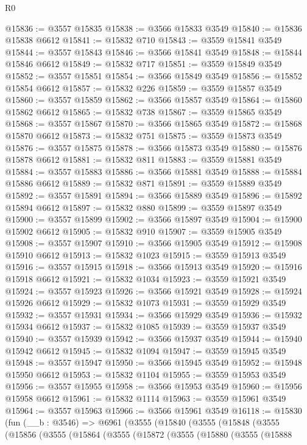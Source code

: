 \begin{lexlean}{R0}
\begin{coremodule}
@15836 := @3557 @15835
@15838 := @3566 @15833 @3549
@15840 := @15836 @15838 @6612
@15841 := @15832 @710
@15843 := @3559 @15841 @3549
@15844 := @3557 @15843
@15846 := @3566 @15841 @3549
@15848 := @15844 @15846 @6612
@15849 := @15832 @717
@15851 := @3559 @15849 @3549
@15852 := @3557 @15851
@15854 := @3566 @15849 @3549
@15856 := @15852 @15854 @6612
@15857 := @15832 @226
@15859 := @3559 @15857 @3549
@15860 := @3557 @15859
@15862 := @3566 @15857 @3549
@15864 := @15860 @15862 @6612
@15865 := @15832 @738
@15867 := @3559 @15865 @3549
@15868 := @3557 @15867
@15870 := @3566 @15865 @3549
@15872 := @15868 @15870 @6612
@15873 := @15832 @751
@15875 := @3559 @15873 @3549
@15876 := @3557 @15875
@15878 := @3566 @15873 @3549
@15880 := @15876 @15878 @6612
@15881 := @15832 @811
@15883 := @3559 @15881 @3549
@15884 := @3557 @15883
@15886 := @3566 @15881 @3549
@15888 := @15884 @15886 @6612
@15889 := @15832 @871
@15891 := @3559 @15889 @3549
@15892 := @3557 @15891
@15894 := @3566 @15889 @3549
@15896 := @15892 @15894 @6612
@15897 := @15832 @880
@15899 := @3559 @15897 @3549
@15900 := @3557 @15899
@15902 := @3566 @15897 @3549
@15904 := @15900 @15902 @6612
@15905 := @15832 @910
@15907 := @3559 @15905 @3549
@15908 := @3557 @15907
@15910 := @3566 @15905 @3549
@15912 := @15908 @15910 @6612
@15913 := @15832 @1023
@15915 := @3559 @15913 @3549
@15916 := @3557 @15915
@15918 := @3566 @15913 @3549
@15920 := @15916 @15918 @6612
@15921 := @15832 @1034
@15923 := @3559 @15921 @3549
@15924 := @3557 @15923
@15926 := @3566 @15921 @3549
@15928 := @15924 @15926 @6612
@15929 := @15832 @1073
@15931 := @3559 @15929 @3549
@15932 := @3557 @15931
@15934 := @3566 @15929 @3549
@15936 := @15932 @15934 @6612
@15937 := @15832 @1085
@15939 := @3559 @15937 @3549
@15940 := @3557 @15939
@15942 := @3566 @15937 @3549
@15944 := @15940 @15942 @6612
@15945 := @15832 @1094
@15947 := @3559 @15945 @3549
@15948 := @3557 @15947
@15950 := @3566 @15945 @3549
@15952 := @15948 @15950 @6612
@15953 := @15832 @1104
@15955 := @3559 @15953 @3549
@15956 := @3557 @15955
@15958 := @3566 @15953 @3549
@15960 := @15956 @15958 @6612
@15961 := @15832 @1114
@15963 := @3559 @15961 @3549
@15964 := @3557 @15963
@15966 := @3566 @15961 @3549
@16118 := @15830
    (fun (__b : @3546) =>
    @6961
      (@3555
        (@15840
          (@3555
            (@15848
              (@3555
                (@15856
                  (@3555
                    (@15864
                      (@3555
                        (@15872
                          (@3555
                            (@15880
                              (@3555
                                (@15888

\end{coremodule}
\end{lexlean}
